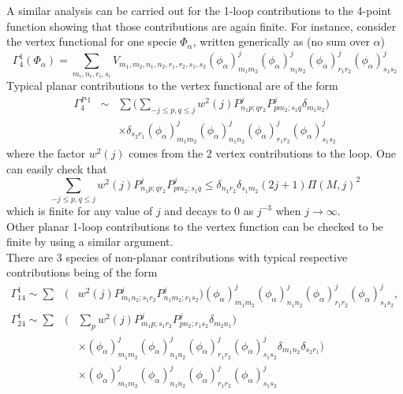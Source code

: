 \documentclass[10pt]{book}
\theoremstyle{break}
\begin{document}
A similar analysis can be carried out for the 1-loop contributions to the 4-point function showing that those contributions are again finite. For instance, consider the vertex functional for one specie $\Phi_\alpha$, written generically as (no sum over $\alpha$)
\begin{equation}
\Gamma^1_4(\Phi_\alpha)=\sum_{m_i,n_i,r_i,s_i} V_{m_1,m_2,n_1,n_2,r_1,r_2,s_1,s_2}(\phi_\alpha)^j_{m_1m_2}(\phi_\alpha)^j_{n_1n_2}(\phi_\alpha)^j_{r_1r_2}(\phi_\alpha)^j_{s_1s_2}%
\end{equation}
Typical planar contributions to the vertex functional are of the form
\begin{eqnarray}
\Gamma^{P\ 1}_4&\sim&\sum\big(\sum_{-j\le p,q\le j}w^2(j)P^j_{n_1p;qr_2}P^j_{pm_2;s_1q}\delta_{m_1n_2}\big)\nonumber\\
&&\times\delta_{s_2r_1} (\phi_\alpha)^j_{m_1m_2}(\phi_\alpha)^j_{n_1n_2}(\phi_\alpha)^j_{r_1r_2}(\phi_\alpha)^j_{s_1s_2}%
\end{eqnarray}
where the factor $w^2(j)$ comes from the 2 vertex contributions to the loop. One can easily check that
\begin{equation}
\sum_{-j\le p,q\le j}w^2(j)P^j_{n_1p;qr_2}P^j_{pm_2;s_1q}\le\delta_{n_1r_2}
\delta_{s_1m_2}(2j+1)\Pi(M,j)^2%
\end{equation}
which is finite for any value of $j$ and decays to $0$ as $j^{-3}$ when $j\to\infty$. \\
Other planar 1-loop contributions to the vertex function can be checked to be finite by using a similar argument.\\
There are 3 species of non-planar contributions with typical respective contributions being of the form
\begin{eqnarray}
\Gamma^1_{14}\sim\sum &\big(&w^2(j)P^j_{m_1n_2;s_1r_2}P^j_{n_1m_2;r_1s_2}\big)(\phi_\alpha)^j_{m_1m_2}(\phi_\alpha)^j_{n_1n_2}(\phi_\alpha)^j_{r_1r_2}(\phi_\alpha)^j_{s_1s_2}%
,\\
\Gamma^1_{24}\sim\sum&\big(&\sum_pw^2(j)P^j_{m_1p;s_1r_2}P^j_{pn_2;r_1s_2}\delta_{m_2n_1}\big)\nonumber\\
&&\times(\phi_\alpha)^j_{m_1m_2}(\phi_\alpha)^j_{n_1n_2}(\phi_\alpha)^j_{r_1r_2}(\phi_\alpha)^j_{s_1s_2}%
\delta_{m_1n_2}\delta_{s_2r_1} \big)\nonumber\\
&&\times(\phi_\alpha)^j_{m_1m_2}(\phi_\alpha)^j_{n_1n_2}(\phi_\alpha)^j_{r_1r_2}(\phi_\alpha)^j_{s_1s_2}%
\end{eqnarray}
\end{document}
